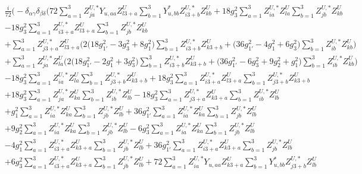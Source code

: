 \begin{align} 
 &\frac{i}{72} \Big(- \delta_{\alpha \gamma} \delta_{\beta \delta} \Big(72 \sum_{a=1}^{3}Z^{U,*}_{j a} Y_{u,{a a}} Z_{{l 3 + a}}^{U}  \sum_{b=1}^{3}Y^*_{u,{b b}} Z^{U,*}_{i 3 + b} Z_{{k b}}^{U}  +18 g_{3}^{2} \sum_{a=1}^{3}Z^{U,*}_{i a} Z_{{l a}}^{U}  \sum_{b=1}^{3}Z^{U,*}_{j b} Z_{{k b}}^{U}  \nonumber \\ 
 &-18 g_{3}^{2} \sum_{a=1}^{3}Z^{U,*}_{i 3 + a} Z_{{l 3 + a}}^{U}  \sum_{b=1}^{3}Z^{U,*}_{j b} Z_{{k b}}^{U}  \nonumber \\ 
 &+\sum_{a=1}^{3}Z^{U,*}_{j 3 + a} Z_{{l 3 + a}}^{U}  \Big(2 \Big(18 g_{1'}^{2}  -3 g_{3}^{2}  + 8 g_{1}^{2} \Big)\sum_{b=1}^{3}Z^{U,*}_{i 3 + b} Z_{{k 3 + b}}^{U}   + \Big(36 g_{1'}^{2}  -4 g_{1}^{2}  + 6 g_{3}^{2} \Big)\sum_{b=1}^{3}Z^{U,*}_{i b} Z_{{k b}}^{U}  \Big)\nonumber \\ 
 &+\sum_{a=1}^{3}Z^{U,*}_{j a} Z_{{l a}}^{U}  \Big(2 \Big(18 g_{1'}^{2}  -2 g_{1}^{2}  + 3 g_{3}^{2} \Big)\sum_{b=1}^{3}Z^{U,*}_{i 3 + b} Z_{{k 3 + b}}^{U}   + \Big(36 g_{1'}^{2}  -6 g_{3}^{2}  + 9 g_{2}^{2}  + g_{1}^{2}\Big)\sum_{b=1}^{3}Z^{U,*}_{i b} Z_{{k b}}^{U}  \Big)\nonumber \\ 
 &-18 g_{3}^{2} \sum_{a=1}^{3}Z^{U,*}_{i a} Z_{{l a}}^{U}  \sum_{b=1}^{3}Z^{U,*}_{j 3 + b} Z_{{k 3 + b}}^{U}  +18 g_{3}^{2} \sum_{a=1}^{3}Z^{U,*}_{i 3 + a} Z_{{l 3 + a}}^{U}  \sum_{b=1}^{3}Z^{U,*}_{j 3 + b} Z_{{k 3 + b}}^{U}  \nonumber \\ 
 &+18 g_{3}^{2} \sum_{a=1}^{3}Z^{U,*}_{j a} Z_{{k a}}^{U}  \sum_{b=1}^{3}Z^{U,*}_{i b} Z_{{l b}}^{U}  -18 g_{3}^{2} \sum_{a=1}^{3}Z^{U,*}_{j 3 + a} Z_{{k 3 + a}}^{U}  \sum_{b=1}^{3}Z^{U,*}_{i b} Z_{{l b}}^{U}  \nonumber \\ 
 &+g_{1}^{2} \sum_{a=1}^{3}Z^{U,*}_{i a} Z_{{k a}}^{U}  \sum_{b=1}^{3}Z^{U,*}_{j b} Z_{{l b}}^{U}  +36 g_{1'}^{2} \sum_{a=1}^{3}Z^{U,*}_{i a} Z_{{k a}}^{U}  \sum_{b=1}^{3}Z^{U,*}_{j b} Z_{{l b}}^{U}  \nonumber \\ 
 &+9 g_{2}^{2} \sum_{a=1}^{3}Z^{U,*}_{i a} Z_{{k a}}^{U}  \sum_{b=1}^{3}Z^{U,*}_{j b} Z_{{l b}}^{U}  -6 g_{3}^{2} \sum_{a=1}^{3}Z^{U,*}_{i a} Z_{{k a}}^{U}  \sum_{b=1}^{3}Z^{U,*}_{j b} Z_{{l b}}^{U}  \nonumber \\ 
 &-4 g_{1}^{2} \sum_{a=1}^{3}Z^{U,*}_{i 3 + a} Z_{{k 3 + a}}^{U}  \sum_{b=1}^{3}Z^{U,*}_{j b} Z_{{l b}}^{U}  +36 g_{1'}^{2} \sum_{a=1}^{3}Z^{U,*}_{i 3 + a} Z_{{k 3 + a}}^{U}  \sum_{b=1}^{3}Z^{U,*}_{j b} Z_{{l b}}^{U}  \nonumber \\ 
 &+6 g_{3}^{2} \sum_{a=1}^{3}Z^{U,*}_{i 3 + a} Z_{{k 3 + a}}^{U}  \sum_{b=1}^{3}Z^{U,*}_{j b} Z_{{l b}}^{U}  +72 \sum_{a=1}^{3}Z^{U,*}_{i a} Y_{u,{a a}} Z_{{k 3 + a}}^{U}  \sum_{b=1}^{3}Y^*_{u,{b b}} Z^{U,*}_{j 3 + b} Z_{{l b}}^{U}  \nonumber \\ 

\end{align}
